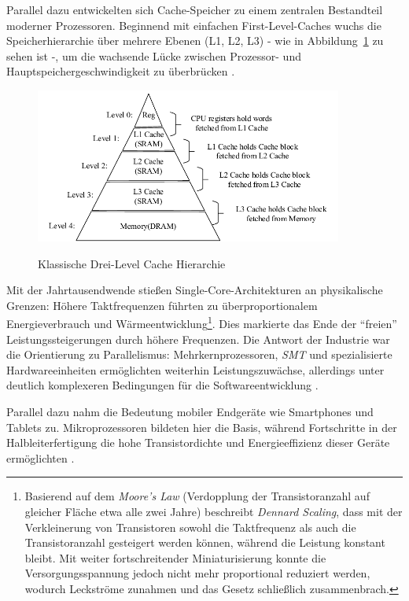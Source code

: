 Parallel dazu entwickelten sich Cache-Speicher zu einem zentralen Bestandteil moderner Prozessoren. Beginnend mit einfachen First-Level-Caches wuchs die Speicherhierarchie über mehrere Ebenen (L1, L2, L3) - wie in Abbildung~\ref{fig:cache_hierarchie} zu sehen ist -, um die wachsende Lücke zwischen Prozessor- und Hauptspeichergeschwindigkeit zu überbrücken \parencite[S.~2]{hennessy_computer_2011}.

\begin{figure}[htbp]
    \centering
    \includegraphics[width=0.90\textwidth]{img/Cache-Hierarchie.png}
    \caption{Klassische Drei-Level Cache Hierarchie}
	\cite{gao_cspm_2022}
    \label{fig:cache_hierarchie}
\end{figure}

Mit der Jahrtausendwende stießen Single-Core-Architekturen an physikalische Grenzen: Höhere Taktfrequenzen führten zu überproportionalem Energieverbrauch und Wärmeentwicklung\footnote{Basierend auf dem \textit{Moore’s Law} (Verdopplung der Transistoranzahl auf gleicher Fläche etwa alle zwei Jahre) beschreibt \textit{Dennard Scaling}, dass mit der Verkleinerung von Transistoren sowohl die Taktfrequenz als auch die Transistoranzahl gesteigert werden können, während die Leistung konstant bleibt. Mit weiter fortschreitender Miniaturisierung konnte die Versorgungsspannung jedoch nicht mehr proportional reduziert werden, wodurch Leckströme zunahmen und das Gesetz schließlich zusammenbrach.}. Dies markierte das Ende der \enquote{freien} Leistungssteigerungen durch höhere Frequenzen. Die Antwort der Industrie war die Orientierung zu Parallelismus: Mehrkernprozessoren, \textit{\ac{SMT}} und spezialisierte Hardwareeinheiten ermöglichten weiterhin Leistungszuwächse, allerdings unter deutlich komplexeren Bedingungen für die Softwareentwicklung \parencites[S.~3f]{shalf_new_2007}[S.~67f]{parkhurst_single_2006}.

Parallel dazu nahm die Bedeutung mobiler Endgeräte wie Smartphones und Tablets zu. Mikroprozessoren bildeten hier die Basis, während Fortschritte in der Halbleiterfertigung die hohe Transistordichte und Energieeffizienz dieser Geräte ermöglichten \parencite[S.~2]{hennessy_computer_2011}.

